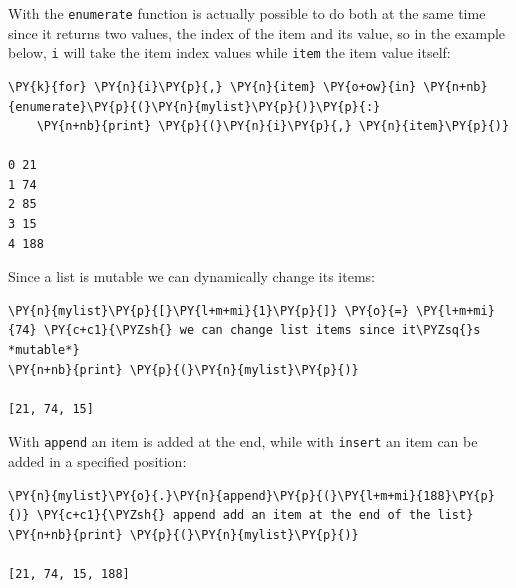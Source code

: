 With the \texttt{enumerate} function is actually possible to do both at the same time since it returns two values, the index of the item and its value, so in the example below, \texttt{i} will take the item index values while \texttt{item} the item value itself:

\begin{tcolorbox}[breakable, size=fbox, boxrule=1pt, pad at break*=1mm, colback=cellbackground, colframe=cellborder]
\begin{Verbatim}[commandchars=\\\{\}]
\PY{k}{for} \PY{n}{i}\PY{p}{,} \PY{n}{item} \PY{o+ow}{in} \PY{n+nb}{enumerate}\PY{p}{(}\PY{n}{mylist}\PY{p}{)}\PY{p}{:}                        
    \PY{n+nb}{print} \PY{p}{(}\PY{n}{i}\PY{p}{,} \PY{n}{item}\PY{p}{)}

0 21
1 74
2 85
3 15
4 188
\end{Verbatim}
\end{tcolorbox}

Since a list is mutable we can dynamically change its items:

\begin{tcolorbox}[breakable, size=fbox, boxrule=1pt, pad at break*=1mm, colback=cellbackground, colframe=cellborder]
\begin{Verbatim}[commandchars=\\\{\}]
\PY{n}{mylist}\PY{p}{[}\PY{l+m+mi}{1}\PY{p}{]} \PY{o}{=} \PY{l+m+mi}{74} \PY{c+c1}{\PYZsh{} we can change list items since it\PYZsq{}s *mutable*}
\PY{n+nb}{print} \PY{p}{(}\PY{n}{mylist}\PY{p}{)}

[21, 74, 15]
\end{Verbatim}
\end{tcolorbox}

With \texttt{append} an item is added at the end, while with \texttt{insert} an item can be added in a specified position:

\begin{tcolorbox}[breakable, size=fbox, boxrule=1pt, pad at break*=1mm, colback=cellbackground, colframe=cellborder]
\begin{Verbatim}[commandchars=\\\{\}]
\PY{n}{mylist}\PY{o}{.}\PY{n}{append}\PY{p}{(}\PY{l+m+mi}{188}\PY{p}{)} \PY{c+c1}{\PYZsh{} append add an item at the end of the list}
\PY{n+nb}{print} \PY{p}{(}\PY{n}{mylist}\PY{p}{)}

[21, 74, 15, 188]
\end{Verbatim}
\end{tcolorbox}

